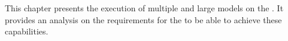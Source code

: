 This chapter presents the execution of multiple and large models on the \graicore{}.
It provides an analysis on the requirements for the \confignoc{} to be able to achieve these capabilities.